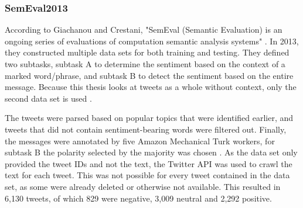 
\subsubsection{SemEval2013}
According to Giachanou and Crestani, "SemEval (Semantic Evaluation) is an ongoing series of evaluations of computation semantic analysis systems" \cite[p.~28:31]{DBLP:journals/csur/GiachanouC16}. In 2013, they constructed multiple data sets for both training and testing. They defined two subtasks, subtask A to determine the sentiment based on the context of a marked word/phrase, and subtask B to detect the sentiment based on the entire message. Because this thesis looks at tweets as a whole without context, only the second data set is used \cite{nakov-etal-2013-semeval}.

The tweets were parsed based on popular topics that were identified earlier, and tweets that did not contain sentiment-bearing words were filtered out. Finally, the messages were annotated by five Amazon Mechanical Turk workers, for subtask B the polarity selected by the majority was chosen \cite{nakov-etal-2013-semeval}. As the data set only provided the tweet IDs and not the text, the Twitter API was used to crawl the text for each tweet. This was not possible for every tweet contained in the data set, as some were already deleted or otherwise not available. This resulted in 6,130 tweets, of which 829 were negative, 3,009 neutral and 2,292 positive.



